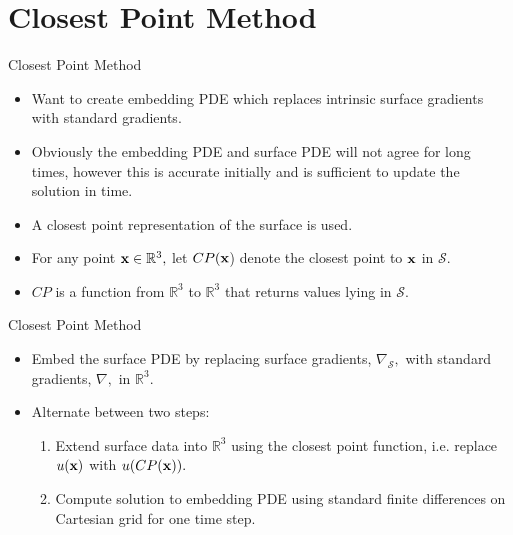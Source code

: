 \documentclass{beamer}
\begin{document}
\section{Closest Point Method}
\begin{frame}{Closest Point Method}
\begin{itemize}
\item Want to create embedding PDE which replaces intrinsic surface gradients with standard gradients.
\item Obviously the embedding PDE and surface PDE will not agree for long times, however this is accurate initially and is sufficient to update the solution in time.
\item A closest point representation of the surface is used.
\item For any point ${\bf x}\in \mathbb{R}^3,$ let $CP({\bf x}$) denote the closest point to ${\bf x}$ in $\mathcal{S}.$ 
\item $CP$ is a function from $\mathbb{R}^3$ to $\mathbb{R}^3$ that returns values lying in $\mathcal{S}.$ 
%
\end{itemize}
\end{frame}

\begin{frame}{Closest Point Method}
\begin{itemize}
\item Embed the surface PDE by replacing surface gradients, $\nabla_{\mathcal{S}},$ with standard gradients, $\nabla,$ in $\mathbb{R}^3.$
\item Alternate between two steps:
\begin{enumerate}
\item Extend surface data into $\mathbb{R}^3$ using the closest point function, i.e. replace $u({\bf x})$ with $u(CP({\bf x})).$
\item Compute solution to embedding PDE using standard finite differences on Cartesian grid for one time step.
\end{enumerate}
\end{itemize}
\end{frame}
\end{document}
